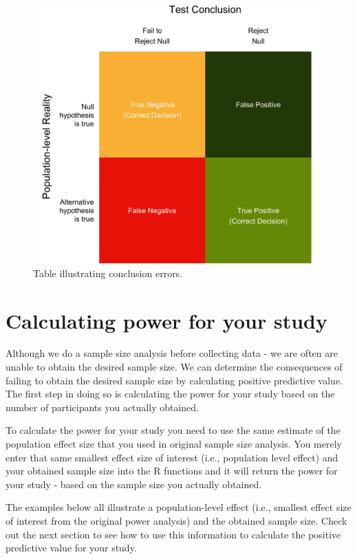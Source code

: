 \documentclass[
]{krantz}
\begin{document}
\begin{figure}
\includegraphics[width=0.9\linewidth]{ch_ppv/images/fig9} \caption{Table illustrating conclusion errors.}\label{fig:ppvfig9}
\end{figure}

\hypertarget{calculating-power-for-your-study}{%
\section{Calculating power for your study}\label{calculating-power-for-your-study}}

Although we do a sample size analysis before collecting data - we are often are unable to obtain the desired sample size. We can determine the consequences of failing to obtain the desired sample size by calculating positive predictive value. The first step in doing so is calculating the power for your study based on the number of participants you actually obtained.

To calculate the power for your study you need to use the same estimate of the population effect size that you used in original sample size analysis. You merely enter that same smallest effect size of interest (i.e., population level effect) and your obtained sample size into the R functions and it will return the power for your study - based on the sample size you actually obtained.

The examples below all illustrate a population-level effect (i.e., smallest effect size of interest from the original power analysis) and the obtained sample size. Check out the next section to see how to use this information to calculate the positive predictive value for your study.
\end{document}
